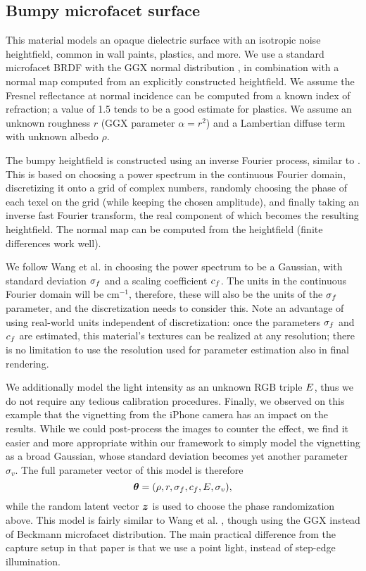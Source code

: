 \subsection{Bumpy microfacet surface}

This material models an opaque dielectric surface with an isotropic noise heightfield, common in wall paints, plastics, and more. We use a standard microfacet BRDF with the GGX normal distribution \cite{Walter2007}, in combination with a normal map computed from an explicitly constructed heightfield. We assume the Fresnel reflectance at normal incidence can be computed from a known index of refraction; a value of 1.5 tends to be a good estimate for plastics. We assume an unknown roughness $r$ (GGX parameter $\alpha=r^2$) and a Lambertian diffuse term with unknown albedo $\rho$.

The bumpy heightfield is constructed using an inverse Fourier process, similar to \cite{Wang2011}. This is based on choosing a power spectrum in the continuous Fourier domain, discretizing it onto a grid of complex numbers, randomly choosing the phase of each texel on the grid (while keeping the chosen amplitude), and finally taking an inverse fast Fourier transform, the real component of which becomes the resulting heightfield. The normal map can be computed from the heightfield (finite differences work well).

We follow Wang et al. in choosing the power spectrum to be a Gaussian, with standard deviation $\sigma_f$ and a scaling coefficient $c_f$. The units in the continuous Fourier domain will be cm$^{-1}$, therefore, these will also be the units of the $\sigma_f$ parameter, and the discretization needs to consider this. Note an advantage of using real-world units independent of discretization: once the parameters $\sigma_f$ and $c_f$ are estimated, this material's textures can be realized at any resolution; there is no limitation to use the resolution used for parameter estimation also in final rendering.

We additionally model the light intensity as an unknown RGB triple $E$, thus we do not require any tedious calibration procedures. Finally, we observed on this example that the vignetting from the iPhone camera has an impact on the results. While we could post-process the images to counter the effect, we find it easier and more appropriate within our framework to simply model the vignetting as a broad Gaussian, whose standard deviation becomes yet another parameter $\sigma_v$. The full parameter vector of this model is therefore
\[
\bm{\theta} = (\rho, r, \sigma_f, c_f, E, \sigma_v),
\]
while the random latent vector $\bm{z}$ is used to choose the phase randomization above. This model is fairly similar to Wang et al. , though using the GGX instead of Beckmann microfacet distribution. The main practical difference from the capture setup in that paper is that we use a point light, instead of step-edge illumination.

